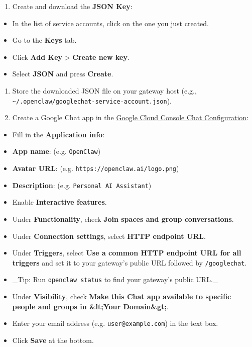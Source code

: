 \begin{enumerate}
  \item Create and download the \textbf{JSON Key}:
\end{enumerate}

\begin{itemize}
  \item In the list of service accounts, click on the one you just created.
  \item Go to the \textbf{Keys} tab.
  \item Click \textbf{Add Key} > \textbf{Create new key}.
  \item Select \textbf{JSON} and press \textbf{Create}.
\end{itemize}

\begin{enumerate}
  \item Store the downloaded JSON file on your gateway host (e.g., \texttt{\textasciitilde{}/.openclaw/googlechat-service-account.json}).
  \item Create a Google Chat app in the \href{https://console.cloud.google.com/apis/api/chat.googleapis.com/hangouts-chat}{Google Cloud Console Chat Configuration}:
\end{enumerate}

\begin{itemize}
  \item Fill in the \textbf{Application info}:
  \item \textbf{App name}: (e.g. \texttt{OpenClaw})
  \item \textbf{Avatar URL}: (e.g. \texttt{https://openclaw.ai/logo.png})
  \item \textbf{Description}: (e.g. \texttt{Personal AI Assistant})
  \item Enable \textbf{Interactive features}.
  \item Under \textbf{Functionality}, check \textbf{Join spaces and group conversations}.
  \item Under \textbf{Connection settings}, select \textbf{HTTP endpoint URL}.
  \item Under \textbf{Triggers}, select \textbf{Use a common HTTP endpoint URL for all triggers} and set it to your gateway's public URL followed by \texttt{/googlechat}.
  \item \_Tip: Run \texttt{openclaw status} to find your gateway's public URL.\_
  \item Under \textbf{Visibility}, check \textbf{Make this Chat app available to specific people and groups in \&lt;Your Domain\&gt;}.
  \item Enter your email address (e.g. \texttt{user@example.com}) in the text box.
  \item Click \textbf{Save} at the bottom.
\end{itemize}

